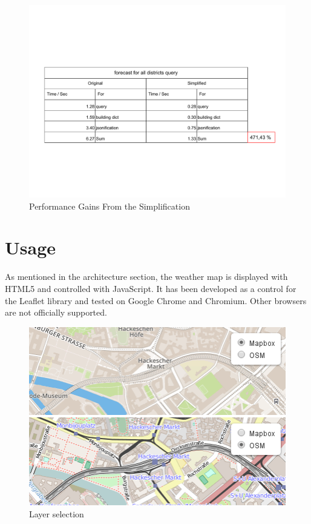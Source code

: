 \documentclass[paper=a4, fontsize=11pt]{article} %
\numberwithin{equation}{section} %
\numberwithin{figure}{section} %
\numberwithin{table}{section} %
\begin{document}
\begin{figure}[htbp]
	\centering
	\includegraphics[trim = 0mm 0mm 0mm 0mm, clip, width=1.1\textwidth]{pictures/simplification_table}
	\caption{Performance Gains From the Simplification}
	\label{simplification_table}
\end{figure}

\newpage
\section{Usage}\label{usage}

As mentioned in the architecture section, the weather map is displayed
with HTML5 and controlled with JavaScript. It has been developed as a
control for the Leaflet library and tested on Google Chrome and
Chromium. Other browsers are not officially supported.

\begin{figure}[htbp]
\includegraphics[width=1\textwidth]{pictures/screenshot-baselayer.png}
\caption{Layer selection}
\label{fig:layer-selection}
\end{figure}
\end{document}
